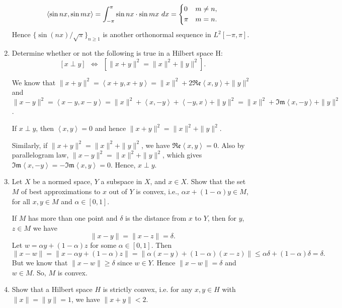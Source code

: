\documentclass[12pt]{article}
\newcommand{\al}{\alpha}
\newcommand{\inn}[2]{\left\langle #1, #2 \right\rangle}
\newcommand{\real}{\mathfrak{Re}}
\begin{document}
\begin{enumerate}
\begin{mybox}
    $$\inn{\sin nx}{\sin mx}=\int_{-\pi}^{\pi}{
        \sin nx \cdot\sin mx\ dx
    }=\begin{dcases}
        0 & m\neq n,\\
        \pi & m=n.
    \end{dcases}$$
    Hence $\{\sin (nx)/\sqrt{\pi}\}_{n\geq 1}$ is another
    orthonormal sequence in $L^2[-\pi,\pi]$.
\end{mybox}
 
 
\item Determine whether or not the following is true in
a Hilbert space H: 
$$[x \perp y ]\ \  \iff\ \  [\|x+y\|^2 = \|x\|^2 +
\|y\|^2].$$
\begin{mybox}

    We know that $\|x+y\|^2=\inn{x+y}{x+y}=\|x\|^2
    +2\real\inn{x}{y}+\|y\|^2$ and
    $\|x-y\|^2=\inn{x-y}{x-y}=\|x\|^2
    +\inn{x}{-y}+\inn{-y}{x}+\|y\|^2
    =\|x\|^2
    +\mathfrak{Im}\inn{x}{-y}+\|y\|^2$.

    \vspace*{3mm}
    If $x\perp y$, then $\inn{x}{y}=0$ and hence
    $\|x+y\|^2 = \|x\|^2 +\|y\|^2$.
    
    \vspace*{3mm}
    Similarly, if
    $\|x+y\|^2 = \|x\|^2 +\|y\|^2$, we have
    $\real\inn{x}{y}=0$. Also by parallelogram law,
    $\|x-y\|^2 = \|x\|^2 +\|y\|^2$, which gives
    $\mathfrak{Im}\inn{x}{-y}=-\mathfrak{Im}\inn{x}{y}
    =0$. Hence, $x\perp y$.
\end{mybox}

\item Let $X$ be a normed space, $Y$ a subspace in $X$,
and $x
\in X$. Show that the set $M$ of best approximations to
$x$ out of $Y$ is convex, i.e., $\al x + (1-\al)y \in  M$,
for all $x,y \in M$ and $\al \in [0,1]$.

\begin{mybox}

    If $M$ has more than one point and
    $\delta$ is the distance from $x$ to $Y$, then 
    for $y$, $z\in M$ we have
    $$\|x-y\|=\|x-z\|=\delta.$$
    Let $w=\alpha y+(1-\alpha)z$ for some
    $\alpha\in [0,1]$. Then
    $$\|x-w\|=\|x-\alpha y+(1-\alpha)z\|=
    \|\alpha(x-y)+(1-\alpha)(x-z)\|\leq \alpha\delta
    +(1-\alpha)\delta=\delta.$$
    But we know that $\|x-w\|\geq \delta$ since $w\in Y$.
    Hence $\|x-w\|=\delta$ and $w\in M$. So, $M$ is convex.
\end{mybox}
 
\item Show that a Hilbert space $H$ is strictly convex,
i.e. for any $x,y \in H$ with $\|x \| = \|y\| = 1$, we
have $\|x+y\| < 2$.
\begin{mybox}


\end{mybox}
\end{enumerate}
\end{document}
